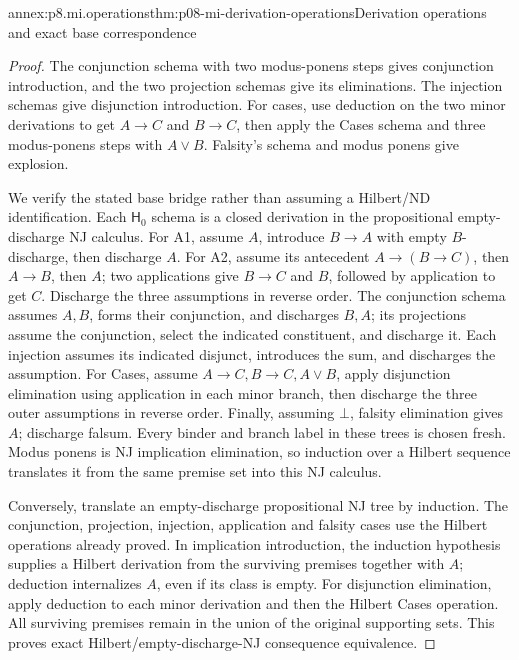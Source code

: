 \begin{annexitem}{annex:p8.mi.operations}{thm:p08-mi-derivation-operations}{Derivation operations and exact base correspondence}
\begin{proof}
The conjunction schema with two modus-ponens steps gives conjunction
introduction, and the two projection schemas give its eliminations.
The injection schemas give disjunction introduction. For cases, use
deduction on the two minor derivations to get \(A\to C\) and
\(B\to C\), then apply the Cases schema and three modus-ponens steps
with \(A\lor B\). Falsity's schema and modus ponens give explosion.

We verify the stated base bridge rather than assuming a Hilbert/ND
identification. Each \(\mathsf H_0\) schema is a closed derivation in
the propositional empty-discharge NJ calculus. For A1, assume \(A\),
introduce \(B\to A\) with empty \(B\)-discharge, then discharge
\(A\). For A2, assume its antecedent \(A\to(B\to C)\), then
\(A\to B\), then \(A\); two applications give \(B\to C\) and
\(B\), followed by application to get \(C\). Discharge the three
assumptions in reverse order. The conjunction schema assumes \(A,B\),
forms their conjunction, and discharges \(B,A\); its projections assume
the conjunction, select the indicated constituent, and discharge it.
Each injection assumes its indicated disjunct, introduces the sum, and
discharges the assumption. For Cases, assume \(A\to C,B\to C,A\lor B\),
apply disjunction elimination using application in each minor branch,
then discharge the three outer assumptions in reverse order. Finally,
assuming \(\bot\), falsity elimination gives \(A\); discharge falsum.
Every binder and branch label in these trees is chosen fresh. Modus
ponens is NJ implication elimination, so induction over a Hilbert
sequence translates it from the same premise set into this NJ calculus.

Conversely, translate an empty-discharge propositional NJ tree by induction.
The conjunction, projection, injection, application and falsity cases use
the Hilbert operations already proved. In implication introduction, the
induction hypothesis supplies a Hilbert derivation from the surviving
premises together with \(A\); deduction internalizes \(A\), even if
its class is empty. For disjunction elimination, apply deduction to
each minor derivation and then the Hilbert Cases operation. All surviving
premises remain in the union of the original supporting sets.
This proves exact Hilbert/empty-discharge-NJ consequence equivalence.


\end{proof}
\end{annexitem}
